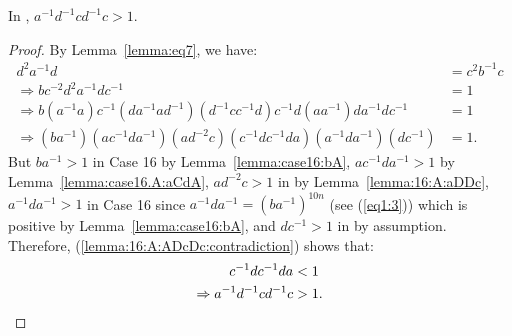 \begin{lemma} In , $a^{-1}d^{-1}cd^{-1}c>1$.
\label{lemma:16:A:ADcDc}
\end{lemma}
\begin{proof} By Lemma~\ref{lemma:eq7}, we have:
\begin{align}
d^{2}a^{-1}d&=c^{2}b^{-1}c\nonumber{}\\
\Rightarrow{}bc^{-2}d^{2}a^{-1}dc^{-1}&=1\nonumber{}\\
\Rightarrow{}b(a^{-1}a)c^{-1}(da^{-1}ad^{-1})(d^{-1}cc^{-1}d)c^{-1}d(aa^{-1})da^{-1}dc^{-1}&=1\nonumber{}\\
\Rightarrow{}(ba^{-1})(ac^{-1}da^{-1})(ad^{-2}c)(c^{-1}dc^{-1}da)(a^{-1}da^{-1})(dc^{-1})&=1.\label{lemma:16:A:ADcDc:contradiction}
\end{align}
But $ba^{-1}>1$ in Case 16 by Lemma~\ref{lemma:case16:bA}, $ac^{-1}da^{-1}>1$ by Lemma~\ref{lemma:case16.A:aCdA}, $ad^{-2}c>1$ in  by Lemma~\ref{lemma:16:A:aDDc}, $a^{-1}da^{-1}>1$ in Case 16 since $a^{-1}da^{-1}=(ba^{-1})^{10n}$ (see (\ref{eq1:3})) which is positive by Lemma~\ref{lemma:case16:bA}, and $dc^{-1}>1$ in  by assumption. Therefore, (\ref{lemma:16:A:ADcDc:contradiction}) shows that:
\begin{align*}
c^{-1}dc^{-1}da&<1\\
\Rightarrow{}a^{-1}d^{-1}cd^{-1}c&>1.\qedhere
\end{align*}
\end{proof}

